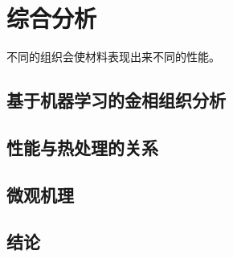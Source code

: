 \chapter{综合分析}
不同的组织会使材料表现出来不同的性能。
\section{基于机器学习的金相组织分析}
\section{性能与热处理的关系}
\section{微观机理}
\section{结论}
